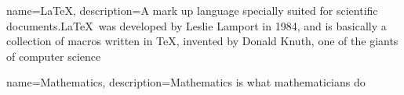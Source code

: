 \RequirePackage{glossaries}
\makeglossaries


{
    name=\LaTeX,
    description={A mark up language specially suited 
    for scientific documents.\LaTeX\ was developed by Leslie Lamport in 1984, and is basically a collection of macros written in \TeX, invented by Donald Knuth, one of the giants of computer science}
}

{
    name=Mathematics,
    description={Mathematics is what mathematicians do}
}




